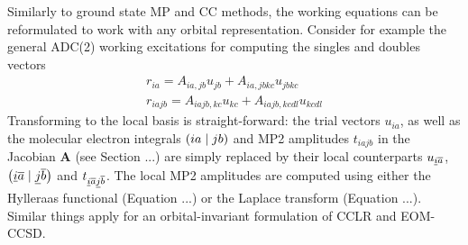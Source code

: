 Similarly to ground state MP and CC methods, the working equations can be reformulated to work with any orbital representation. Consider for example the general ADC(2) working excitations for computing the singles and doubles vectors
\begin{equation}
\begin{split}
r_{ia} = A_{ia,jb} u_{jb} + A_{ia,jbkc} u_{jbkc} \\
r_{iajb} = A_{iajb,kc} u_{kc} + A_{iajb,kcdl} u_{kcdl}
\end{split}
\end{equation}
\noindent Transforming to the local basis is straight-forward: the trial vectors $u_{ia}$, as well as the molecular electron integrals $\left( ia \mid jb \right)$ and MP2 amplitudes $t_{iajb}$ in the Jacobian $\mathbf{A}$ (see Section ...) are simply replaced by their local counterparts $u_{\underline{i}\overline{a}}$, $\left( \underline{i}\overline{a} \mid \underline{j}\overline{b} \right)$ and $t_{\underline{i}\overline{a}\underline{j}\overline{b}}$. The local MP2 amplitudes are computed using either the Hylleraas functional (Equation ...) or the Laplace transform (Equation ...). Similar things apply for an orbital-invariant formulation of CCLR and EOM-CCSD. 

